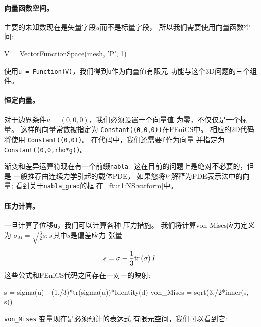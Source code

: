 
\paragraph{向量函数空间。}

主要的未知数现在是矢量字段$u$而不是标量字段，
所以我们需要使用向量函数空间:

\begin{python}
V = VectorFunctionSpace(mesh, 'P', 1)
\end{python}
使用\texttt{u = Function(V)}，我们得到\texttt{u}作为向量值有限元
功能与这个3D问题的三个组件。

\paragraph{恒定向量。}
对于边界条件$u=(0,0,0)$，我们必须设置一个向量值
为零，不仅仅是一个标量。 这样的向量常数被指定为
\texttt{Constant((0,0,0))}在FEniCS中。 相应的2D代码将使用
\texttt{Constant((0,0))}。 在代码中，我们还需要\texttt{f}作为向量
并指定为\texttt{Constant((0,0,rho*g))}。


渐变和差异运算符现在有一个前缀\verb!nabla_!
这在目前的问题上是绝对不必要的，但是
一般推荐由连续力学引起的载体PDE，
如果您将$\nabla$解释为PDE表示法中的向量;
看到关于\verb!nabla_grad!的框 在~\ref{ftut1:NS:varform}中。

\paragraph{压力计算。}
一旦计算了位移\texttt{u}，我们可以计算各种
压力措施。 我们将计算von Mises应力定义为
$\sigma_M = \sqrt{\frac{3}{2}s:s}$其中$s$是偏差应力
张量

\[ s = \sigma - \frac{1}{3}\mathrm{tr}\,(\sigma)\,I\tp\]
这些公式和FEniCS代码之间存在一对一的映射:

\begin{python}
s = sigma(u) - (1./3)*tr(sigma(u))*Identity(d)
von_Mises = sqrt(3./2*inner(s, s))
\end{python}
\verb!von_Mises! 变量现在是必须预计的表达式
有限元空间，我们可以看到它:

